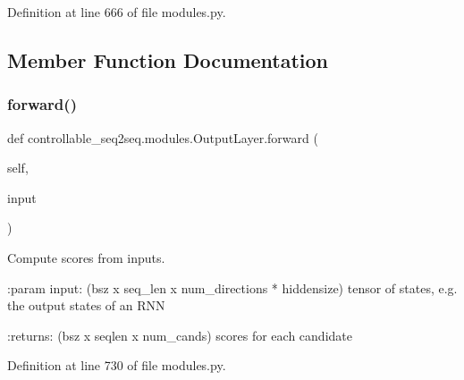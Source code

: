 Definition at line 666 of file modules.\+py.



\subsection{Member Function Documentation}
\mbox{\label{classcontrollable__seq2seq_1_1modules_1_1OutputLayer_aedb4579621c30dfed917004e89aa50cd}} 
\subsubsection{\texorpdfstring{forward()}{forward()}}
{\footnotesize\ttfamily def controllable\+\_\+seq2seq.\+modules.\+Output\+Layer.\+forward (\begin{DoxyParamCaption}\item[{}]{self,  }\item[{}]{input }\end{DoxyParamCaption})}

\begin{DoxyVerb}Compute scores from inputs.

:param input: (bsz x seq_len x num_directions * hiddensize) tensor of
       states, e.g. the output states of an RNN

:returns: (bsz x seqlen x num_cands) scores for each candidate
\end{DoxyVerb}
 

Definition at line 730 of file modules.\+py.



